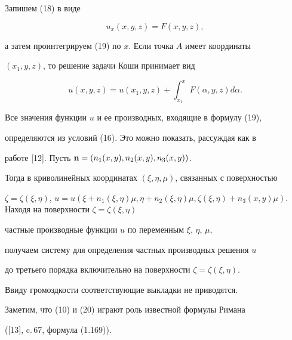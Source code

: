 Запишем (18) в виде


\begin{equation} %


u_{x}(x,y,z)=F(x,y,z),


\end{equation}


а затем проинтегрируем (19) по $x$. Если точка $A$ имеет координаты


$(x_1,y,z)$, то решение задачи Коши принимает вид


\begin{equation} %


u(x,y,z)=u(x_{1},y,z)+\int_{x_{1}}^{x} F(\alpha,y,z)d\alpha.


\end{equation}





Все значения функции $u$ и ее производных, входящие в формулу (19),


определяются из условий (16). Это можно показать, рассуждая как в


работе [12]. Пусть $\bold n =(n_1(x,y),n_2(x,y),n_3(x,y))$.


Тогда в криволинейных координатах $(\xi,\eta,\mu)$, связанных с поверхностью


$\zeta=\zeta(\xi,\eta)$, $u=u(\xi+n_1(\xi,\eta)\mu, \eta+n_2(\xi,\eta)\mu,


\zeta(\xi,\eta)+n_3(x,y)\mu)$. Находя на поверхности $\zeta=\zeta(\xi,\eta)$


частные производные функции $u$ по переменным $\xi$, $\eta$, $\mu$,


получаем систему для определения частных производных решения $u$


до третьего порядка включительно на поверхности $\zeta=\zeta(\xi,\eta)$.


Ввиду громоздкости соответствующие выкладки не приводятся.





Заметим, что (10) и (20) играют роль известной формулы Римана


([13], c.\,67, формула (1.169)).





